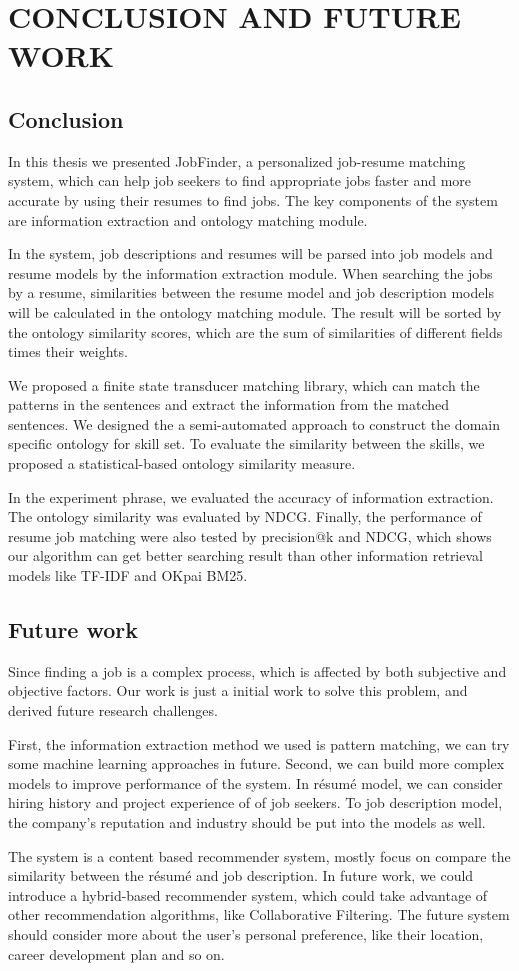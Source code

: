 \chapter{CONCLUSION AND FUTURE WORK}

\section{Conclusion}
In this thesis we presented JobFinder, a personalized job-resume matching system, which can help job seekers to find appropriate jobs faster and more accurate by using their resumes to find jobs. The key components of the system are information extraction and ontology matching module.

In the system, job descriptions and resumes will be parsed into job models and resume models by the information extraction module. When searching the jobs by a resume, similarities between the resume model and job description models will be calculated in the ontology matching module. The result will be sorted by the ontology similarity scores, which are the sum of similarities of different fields times their weights.

We proposed a finite state transducer matching library, which can match the patterns in the sentences and extract the information from the matched sentences. We designed the a semi-automated approach to construct the domain specific ontology for skill set. To evaluate the similarity between the skills, we proposed a statistical-based ontology similarity measure.

In the experiment phrase, we evaluated the accuracy of information extraction. The ontology similarity was evaluated by NDCG. Finally, the performance of resume job matching were also tested by precision@k and NDCG,  which shows our algorithm can get better searching result than other information retrieval models like TF-IDF and OKpai BM25.


\section{Future work}

Since finding a job is a complex process, which is affected by both subjective and objective factors.  Our work is just a initial work to solve this problem, and derived future research challenges.

First, the information extraction method we used is pattern matching, we can try some machine learning approaches in future. Second, we can build more complex models to improve performance of the system. In r\'esum\'e model, we can consider hiring history and project experience of of job seekers. To job description model, the company's reputation and industry should be put into the models as well.

The system is a content based recommender system, mostly focus on compare the similarity between the r\'esum\'e and job description. In future work, we could introduce a hybrid-based recommender system, which could take advantage of other recommendation algorithms, like Collaborative Filtering. The future system should consider more about the user's personal preference, like their location, career development plan and so on.
